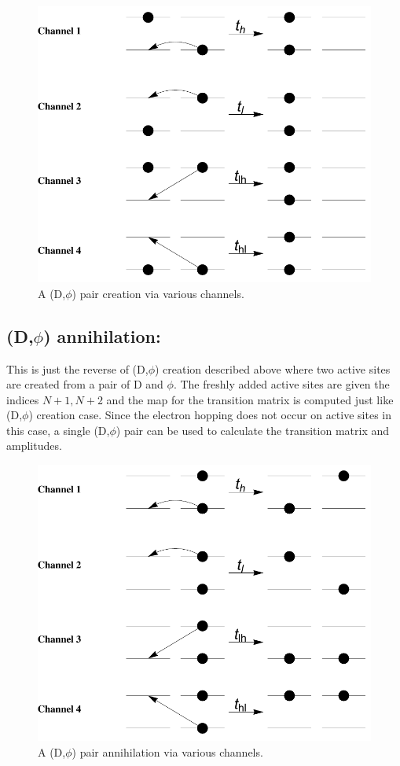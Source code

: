 \documentclass[a4paper,twocolumn]{revtex4-1} %
\begin{document}
\begin{figure}[htpb]
  \centering
  \includegraphics[width=0.4\columnwidth]{DPhiCreation}
   \caption{A (D,$\phi$) pair creation via various channels.
 \label{fig:phihops}}  
\end{figure}










\subsection{(D,$\phi$) annihilation: }
This is just the reverse of (D,$\phi$) creation described above where two active sites are created
from a pair of D and $\phi$. The freshly added active sites are given the indices $N+1,N+2$
and the map for the transition matrix is computed just like (D,$\phi$) creation case.
Since the electron hopping does not occur on active sites in this case,
a single (D,$\phi$) pair can be used to calculate the transition matrix and amplitudes.
\begin{figure}[htpb]
  \centering
  \includegraphics[width=0.4\columnwidth]{PhiDAnnihilation}
   \caption{A (D,$\phi$) pair annihilation via various channels.
 \label{fig:phihops}}  
\end{figure}
\end{document}
